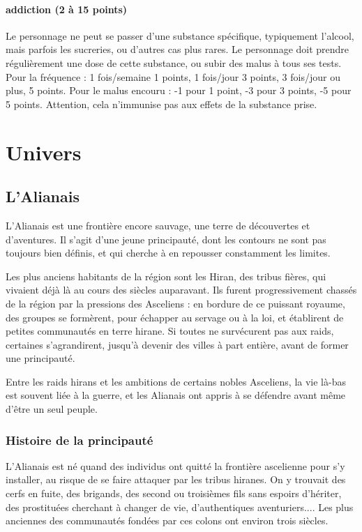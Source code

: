 \documentclass[10pt,a4paper,twocolumn]{book}
\begin{document}
\subsubsection{addiction (2 à 15 points) }
Le personnage ne peut se passer d'une substance spécifique, typiquement l'alcool, mais parfois les sucreries, ou d'autres cas plus rares. Le personnage doit prendre régulièrement une dose de cette substance, ou subir des malus à tous ses tests. Pour la fréquence : 1 fois/semaine 1 points, 1 fois/jour 3 points, 3 fois/jour ou plus, 5 points. Pour le malus encouru : -1 pour 1 point, -3 pour 3 points, -5 pour 5 points. Attention, cela n'immunise pas aux effets de la substance prise.

\chapter{Univers}

\section{L'Alianais}
L'Alianais est une frontière encore sauvage, une terre de découvertes et d'aventures. Il s'agit d'une jeune principauté, dont les contours ne sont pas toujours bien définis, et qui cherche à en repousser constamment les limites.

Les plus anciens habitants de la région sont les Hiran, des tribus fières, qui vivaient déjà là au cours des siècles auparavant. Ils furent progressivement chassés de la région par la pressions des Asceliens : en bordure de ce puissant royaume, des groupes se formèrent, pour échapper au servage ou à la loi, et établirent de petites communautés en terre hirane. Si toutes ne survécurent pas aux raids, certaines s'agrandirent, jusqu'à devenir des villes à part entière, avant de former une principauté.

Entre les raids hirans et les ambitions de certains nobles Asceliens, la vie là-bas est souvent liée à la guerre, et les Alianais ont appris à se défendre avant même d'être un seul peuple.
\subsection{Histoire de la principauté}
L'Alianais est né quand des individus ont quitté la frontière ascelienne pour s'y installer, au risque de se faire attaquer par les tribus hiranes. On y trouvait des cerfs en fuite, des brigands, des second ou troisièmes fils sans espoirs d'hériter, des prostituées cherchant à changer de vie, d'authentiques aventuriers.... Les plus anciennes des communautés fondées par ces colons ont environ trois siècles.
\end{document}
